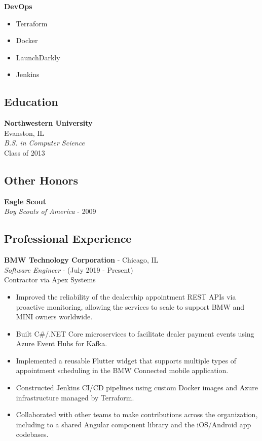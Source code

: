 \documentclass[11pt]{article}
\begin{document}
\begin{paracol}{2}
\noindent \textbf{DevOps}
\begin{itemize}
    \item Terraform
    \item Docker
    \item LaunchDarkly
    \item Jenkins
\end{itemize}

\subsection*{Education}
\textbf{Northwestern University} \\ 
Evanston, IL \\
\textit{B.S. in Computer Science}  \\
{\footnotesize{Class of 2013}}

\subsection*{Other Honors}
\textbf{Eagle Scout} \\
\textit{Boy Scouts of America} - {\footnotesize{2009}}

\switchcolumn 

\subsection*{Professional Experience} 

\textbf{BMW Technology Corporation} - Chicago, IL \\
\textit{Software Engineer} - {\footnotesize{(July 2019 - Present)}} \\
{\footnotesize{Contractor via Apex Systems}} 
\begin{itemize}
    \item Improved the reliability of the dealership appointment REST APIs via proactive monitoring, allowing the services to scale to support BMW and MINI owners worldwide.
    \item Built C\#/.NET Core microservices to facilitate dealer payment events using Azure Event Hubs for Kafka.
    \item Implemented a reusable Flutter widget that supports multiple types of appointment scheduling in the BMW Connected mobile application.
    \item Constructed Jenkins CI/CD pipelines using custom Docker images and Azure infrastructure managed by Terraform.
    \item Collaborated with other teams to make contributions across the organization, including to a shared Angular component library and the iOS/Android app codebases.
\end{itemize} 



\end{paracol}
\end{document}
